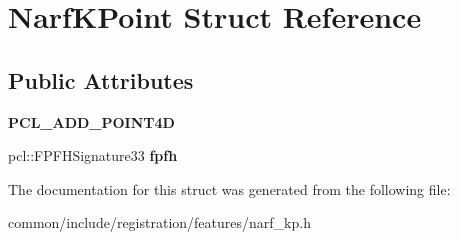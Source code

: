 \hypertarget{structNarfKPoint}{
\section{NarfKPoint Struct Reference}
\label{structNarfKPoint}
}
\subsection*{Public Attributes}
\begin{DoxyCompactItemize}
\item 
\hypertarget{structNarfKPoint_ac9343633473e4f247b041b71c171442a}{
{\bfseries PCL\_\-ADD\_\-POINT4D}}
\label{structNarfKPoint_ac9343633473e4f247b041b71c171442a}

\item 
\hypertarget{structNarfKPoint_a6b489582876c17cad61805e8fa9caa9d}{
pcl::FPFHSignature33 {\bfseries fpfh}}
\label{structNarfKPoint_a6b489582876c17cad61805e8fa9caa9d}

\end{DoxyCompactItemize}


The documentation for this struct was generated from the following file:\begin{DoxyCompactItemize}
\item 
common/include/registration/features/narf\_\-kp.h\end{DoxyCompactItemize}
